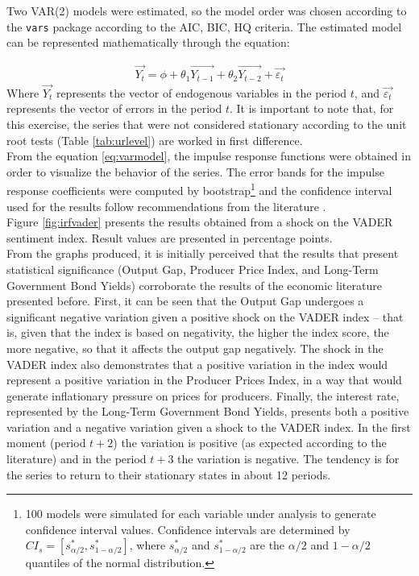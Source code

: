 Two VAR(2) models were estimated, so the model order was chosen according to the \texttt{vars} \cite{pfaff2008var, pfaff2008book} package according to the AIC, BIC, HQ criteria. The estimated model can be represented mathematically through the equation:

\begin{align} \label{eq:varmodel}
    \overrightarrow{Y_t} = \phi + \theta_1 \overrightarrow{Y_{t-1}} + \theta_2 \overrightarrow{Y_{t-2}} + \overrightarrow{\varepsilon_t} 
\end{align}
Where $\overrightarrow{Y_{t}}$ represents the vector of endogenous variables in the period $t$, and $\overrightarrow{\varepsilon_t}$ represents the vector of errors in the period $t$. It is important to note that, for this exercise, the series that were not considered stationary according to the unit root tests (Table \ref{tab:urlevel}) are worked in first difference. \\

From the equation \ref{eq:varmodel}, the impulse response functions were obtained in order to visualize the behavior of the series. The error bands for the impulse response coefficients were computed by bootstrap\footnote{100 models were simulated for each variable under analysis to generate confidence interval values. Confidence intervals are determined by $CI_s = [s^* _{\alpha / 2}, s^* _{1 - \alpha / 2}]$, where $s^* _{\alpha / 2}$ and $s^* _{1 - \alpha / 2}$ are the $\alpha/2$ and $1 - \alpha/2$ quantiles of the normal distribution\cite[p. 17]{pfaff2008var}.} and the confidence interval used for the results follow recommendations from the literature \cite[p. 40]{shapiro2020measuring}.\\

Figure \ref{fig:irfvader} presents the results obtained from a shock on the VADER sentiment index. Result values are presented in percentage points. \\

From the graphs produced, it is initially perceived that the results that present statistical significance (Output Gap, Producer Price Index, and Long-Term Government Bond Yields) corroborate the results of the economic literature presented before. First, it can be seen that the Output Gap undergoes a significant negative variation given a positive shock on the VADER index -- that is, given that the index is based on negativity, the higher the index score, the more negative, so that it affects the output gap negatively. The shock in the VADER index also demonstrates that a positive variation in the index would represent a positive variation in the Producer Prices Index, in a way that would generate inflationary pressure on prices for producers. Finally, the interest rate, represented by the Long-Term Government Bond Yields, presents both a positive variation and a negative variation given a shock to the VADER index. In the first moment (period $t + 2$) the variation is positive (as expected according to the literature) and in the period $t + 3$ the variation is negative. The tendency is for the series to return to their stationary states in about 12 periods.\\



